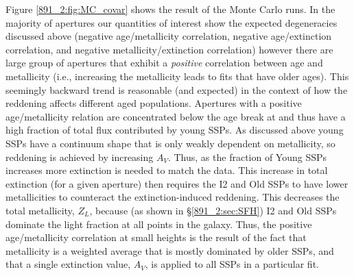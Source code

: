 Figure \ref{891_2:fig:MC_covar} shows the result of the Monte Carlo runs. In
the majority of apertures our quantities of interest show the expected
degeneracies discussed above (negative age/metallicity correlation,
negative age/extinction correlation, and negative
metallicity/extinction correlation) however there are large group of
apertures that exhibit a \emph{positive} correlation between age and
metallicity (i.e., increasing the metallicity leads to fits that have
older ages). This seemingly backward trend is reasonable (and
expected) in the context of how the reddening affects different aged
populations. Apertures with a positive age/metallicity relation are
concentrated below the age break at 
 and thus have a high fraction of total flux
contributed by young SSPs. As discussed above young SSPs have a
continuum shape that is only weakly dependent on metallicity, so
reddening is achieved by increasing $A_V$. Thus, as the fraction of
Young SSPs increases more extinction is needed to match the data. This
increase in total extinction (for a given aperture) then requires the
I2 and Old SSPs to have lower metallicities to counteract the
extinction-induced reddening. This decreases the total metallicity,
$Z_L$, because (as shown in \S\ref{891_2:sec:SFH}) I2 and Old SSPs dominate
the light fraction at all points in the galaxy. Thus, the positive
age/metallicity correlation at small heights is the result of the fact
that metallicity is a weighted average that is mostly dominated by
older SSPs, and that a single extinction value, $A_V$, is applied to
all SSPs in a particular fit.






